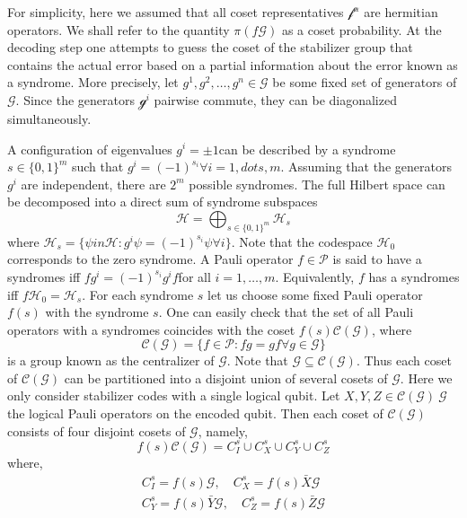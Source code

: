 For simplicity, here we assumed that all coset representatives \(\mathcal{f^{\alpha}}\) are hermitian operators. We shall refer to the quantity \(\pi(f \mathcal{G})\) as a coset probability. At the decoding step one attempts to guess the coset of the stabilizer group that contains the actual error based on a partial information about the error known as a syndrome. More precisely, let \(g^1,g^2,\dots,g^n \in \mathcal{G}\) be some fixed set of generators of \(\mathcal{G}\). Since the generators \(\mathcal{g}^i\) pairwise commute, they can be diagonalized simultaneously.


A configuration  of  eigenvalues \(g^i=\pm 1\)can be described by a syndrome \(s \in \{0,1\}^{m}\) such that \(g^i = (-1)^{s_i} \forall i = 1, dots, m\). Assuming that the generators \(g^i\) are independent, there are \(2^m\) possible syndromes. The full Hilbert  space  can  be  decomposed  into a direct sum of syndrome subspaces
\begin{equation*}
    \mathcal{H} = \bigoplus_{s \in\{0,1\}^{m} }  \mathcal{H}_s
\end{equation*}
where \(\mathcal{H}_s = \{ \psi in \mathcal{H}: g^i \psi = (-1)^{s_i} \psi \forall i\}\). Note that the codespace \(\mathcal{H}_0\) corresponds to the zero syndrome. A Pauli operator \(f \in \mathcal{P}\) is said to have a syndromes iff \(f g^i = (-1)^{s_i} g^i f\)for all \(i = 1, \dots, m\). Equivalently, \(f\) has a syndromes iff \(f \mathcal{H}_0 = \mathcal{H}_s\). For each syndrome \(s\) let us choose some fixed Pauli operator \(f(s)\) with the syndrome \(s\). One can easily check that the set of all Pauli operators with  a  syndromes coincides with the coset \(f(s)\mathcal{C}(\mathcal{G})\), where
\begin{equation*}
    \mathcal{C}(\mathcal{G}) = \{ f \in \mathcal{P}: fg = gf \forall g \in \mathcal{G}\}
\end{equation*}
is a group known as the centralizer of \(\mathcal{G}\). Note that \(\mathcal{G} \subseteq \mathcal{C}(\mathcal{G})\). Thus each coset of \(\mathcal{C}(\mathcal{G})\) can be partitioned into a disjoint union of several cosets of \(\mathcal{G}\). Here we only consider stabilizer codes with a single logical  qubit. Let \(X, Y, Z \in \mathcal{C}(\mathcal{G}) \ \mathcal{G} \) the logical Pauli operators on the encoded qubit. Then each coset of \(\mathcal{C}(\mathcal{G})\) consists of four disjoint cosets of \(\mathcal{G}\), namely,
\begin{equation*}
    f(s) \mathcal{C}(\mathcal{G}) = C_{I}^{s} \cup C_{X}^{s} \cup C_{Y}^{s} \cup C_{Z}^{s}
\end{equation*}
where,
\begin{eqnarray*}
    C_{I}^{s} = f(s)\mathcal{G}, \quad C_{X}^{s} = f(s)\bar{X} \mathcal{G} \\
    C_{Y}^{s} = f(s)\bar{Y}\mathcal{G}, \quad C_{Z}^{s} = f(s)\bar{Z} \mathcal{G}
\end{eqnarray*}

